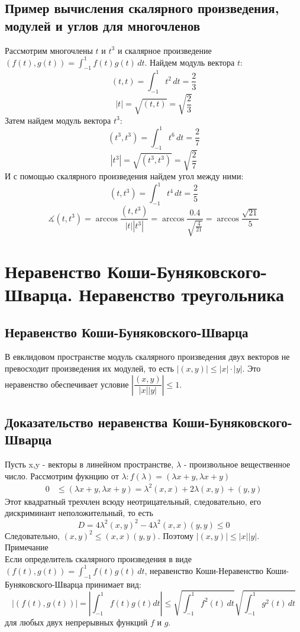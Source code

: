\documentclass[12pt]{article}
\begin{document}
\subsection{Пример вычисления скалярного произведения, модулей и углов для многочленов}
Рассмотрим многочлены $t$ и $t^3$ и скалярное произведение $(f(t),g(t))=\int_{-1}^{1} f(t)g(t)\,dt$.
Найдем модуль вектора $t$:
$$(t,t)=\int_{-1}^{1} t^2\,dt =\frac{2}{3}$$
$$|t|=\sqrt{(t,t)}=\sqrt{\frac{2}{3}}$$
Затем найдем модуль вектора $t^3$:
$$(t^3,t^3)=\int_{-1}^{1} t^6\,dt=\frac{2}{7}$$
$$|t^3|=\sqrt{(t^3,t^3)}=\sqrt{\frac{2}{7}}$$
И с помощью скалярного произведения найдем угол между ними:
$$(t,t^3)=\int_{-1}^{1} t^4\,dt =\frac{2}{5}$$
$$\measuredangle(t,t^3)=\arccos \frac{(t,t^3)}{|t||t^3|}=\arccos \frac{0.4}{\sqrt{\frac{4}{21}}}=\arccos \frac{\sqrt{21}}{5} $$

\section{Неравенство Коши-Буняковского-Шварца. Неравенство треугольника}
\subsection{Неравенство Коши-Буняковского-Шварца}
В евклидовом пространстве модуль скалярного произведения двух векторов не превосходит произведения их модулей, то есть  $|(x,y)| \leq |x| \cdot |y|$.  Это неравенство обеспечивает условие $\left|\dfrac{(x,y)}{|x||y|}\right| \leq 1$.

\subsection{Доказательство неравенства Коши-Буняковского-Шварца}
Пусть x,y - векторы в линейном пространстве, $\lambda$  - произвольное вещественное число. Рассмотрим фукнцию от $\lambda: f(\lambda)=(\lambda x+y,\lambda x+y)$
\begin{align*}
    0 & \leq (\lambda x + y, \lambda x + y)= \lambda^2 (x,x) + 2\lambda (x,y) + (y,y)
\end{align*}
Этот квадратный трехчлен всюду неотрицательный, следовательно, его дискриминант неположительный, то есть
\[
    D = 4\lambda^2(x,y)^2 - 4\lambda^2(x,x)(y,y) \leq 0
\]
Следовательно, $(x,y)^2\leq(x,x)(y,y)$.
Поэтому $|(x,y)| \leq |x||y|$.\\
Примечание \\
Если определитель скалярного произведения в виде $(f(t),g(t))=\int_{-1}^{1} f(t)g(t) \,dt$, неравенство Коши-Неравенство Коши-Буняковского-Шварца принимает вид:
$$|(f(t),g(t))| = \left|\int_{-1}^{1} f(t)g(t)dt\right| \leq \sqrt{\int_{-1}^{1} f^2(t)\,dt} \sqrt{\int_{-1}^{1} g^2(t)\,dt}$$
для любых двух непрерывных функций $f$ и $g$.
\end{document}
